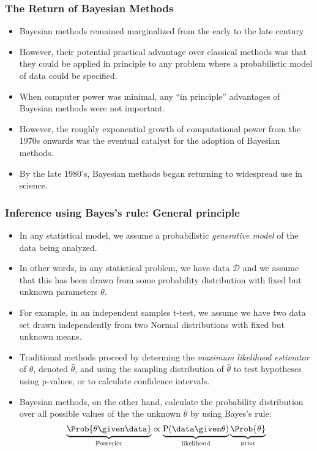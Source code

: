 \documentclass{slides}
\begin{document}
\begin{frame}
	\frametitle{The Return of Bayesian Methods}
	
	\begin{itemize}

		\item Bayesian methods remained marginalized from the early to
			the late  century

		\item However, their potential practical advantage over
			classical methods was that they could be applied in
			principle to any problem where a probabilistic model of
			data could be specified.  

		\item When computer power was minimal, any ``in principle''
			advantages of Bayesian methods were not important.

		\item However, the roughly exponential growth of computational
			power from the 1970s onwards was the eventual catalyst
			for the adoption of Bayesian methods.

		\item By the late 1980's, Bayesian methods began returning to
			widespread use in science.

	\end{itemize}
\end{frame}

\begin{frame}
	\frametitle{Inference using Bayes's rule: General principle}
	\begin{itemize}

		\item In any statistical model, we assume a probabilistic \emph{generative model} of the data being analyzed.
		\item In other words, in any statistical problem, we have data $\mathcal{D}$ and we assume that this has been drawn from some probability distribution with fixed but unknown parameters $\theta$.
		\item For example, in an independent samples t-test, we assume we have two data set drawn independently from two Normal distributions with fixed but unknown means.
		\item Traditional methods proceed by determing the \emph{maximum likelihood estimator} of $\theta$, denoted $\hat{\theta}$, and using the sampling distribution of $\hat{\theta}$ to test hypotheses using p-values, or to calculate confidence intervals.
		\item Bayesian methods, on the other hand, calculate the probability distribution over all possible values of the the unknown $\theta$ by using Bayes's rule:
		\[
			\underbrace{\Prob{\theta \given \data}}_{\text{Posterior}}
			\propto 
			\underbrace{\mathrm{P}(\data \given \theta)}_{\text{likelihood}}\underbrace{\Prob{\theta}}_{\text{prior}}
		\]
	\end{itemize}

\end{frame}
\end{document}

